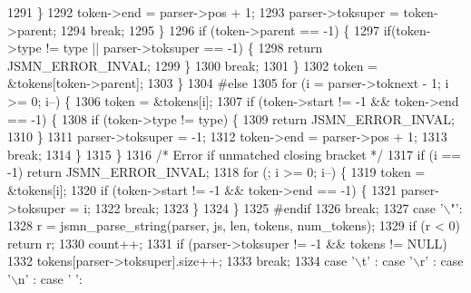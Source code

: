 \begin{DoxyCode}
1291                         \}
1292                         token->end = parser->pos + 1;
1293                         parser->toksuper = token->parent;
1294                         \textcolor{keywordflow}{break};
1295                     \}
1296                     \textcolor{keywordflow}{if} (token->parent == -1) \{
1297                         \textcolor{keywordflow}{if}(token->type != type || parser->toksuper == -1) \{
1298                             \textcolor{keywordflow}{return} JSMN_ERROR_INVAL;
1299                         \}
1300                         \textcolor{keywordflow}{break};
1301                     \}
1302                     token = &tokens[token->parent];
1303                 \}
1304 \textcolor{preprocessor}{#else}
1305                 \textcolor{keywordflow}{for} (i = parser->toknext - 1; i >= 0; i--) \{
1306                     token = &tokens[i];
1307                     \textcolor{keywordflow}{if} (token->start != -1 && token->end == -1) \{
1308                         \textcolor{keywordflow}{if} (token->type != type) \{
1309                             \textcolor{keywordflow}{return} JSMN_ERROR_INVAL;
1310                         \}
1311                         parser->toksuper = -1;
1312                         token->end = parser->pos + 1;
1313                         \textcolor{keywordflow}{break};
1314                     \}
1315                 \}
1316                 \textcolor{comment}{/* Error if unmatched closing bracket */}
1317                 \textcolor{keywordflow}{if} (i == -1) \textcolor{keywordflow}{return} JSMN_ERROR_INVAL;
1318                 \textcolor{keywordflow}{for} (; i >= 0; i--) \{
1319                     token = &tokens[i];
1320                     \textcolor{keywordflow}{if} (token->start != -1 && token->end == -1) \{
1321                         parser->toksuper = i;
1322                         \textcolor{keywordflow}{break};
1323                     \}
1324                 \}
1325 \textcolor{preprocessor}{#endif}
1326                 \textcolor{keywordflow}{break};
1327             \textcolor{keywordflow}{case} \textcolor{charliteral}{'\(\backslash\)"'}:
1328                 r = jsmn_parse_string(parser, js, len, tokens, num\_tokens);
1329                 \textcolor{keywordflow}{if} (r < 0) \textcolor{keywordflow}{return} r;
1330                 count++;
1331                 \textcolor{keywordflow}{if} (parser->toksuper != -1 && tokens != NULL)
1332                     tokens[parser->toksuper].size++;
1333                 \textcolor{keywordflow}{break};
1334             \textcolor{keywordflow}{case} \textcolor{charliteral}{'\(\backslash\)t'} : \textcolor{keywordflow}{case} \textcolor{charliteral}{'\(\backslash\)r'} : \textcolor{keywordflow}{case} \textcolor{charliteral}{'\(\backslash\)n'} : \textcolor{keywordflow}{case} \textcolor{charliteral}{' '}:

\end{DoxyCode}
